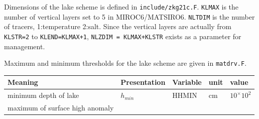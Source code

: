 Dimensions of the lake scheme is defined in \texttt{include/zkg21c.F}.
\texttt{KLMAX} is the number of vertical layers set to 5 in
MIROC6/MATSIRO6. \texttt{NLTDIM} is the number of tracers, 1:temperature
2:salt. Since the vertical layers are actually from \texttt{KLSTR=2} to
\texttt{KLEND=KLMAX+1}, \texttt{NLZDIM\ =\ KLMAX+KLSTR} exists as a
parameter for management.

Maximum and minimum thresholds for the lake scheme are given in
\texttt{matdrv.F}.

\setlength\LTleft{0pt}\setlength\LTright{0pt}\begin{longtable}[]{@{}lllll@{}}
\toprule\relax
\begin{minipage}[b]{0.30\columnwidth}\raggedright
Meaning\strut
\end{minipage} & \begin{minipage}[b]{0.15\columnwidth}\raggedright
Presentation\strut
\end{minipage} & \begin{minipage}[b]{0.09\columnwidth}\raggedright
Variable\strut
\end{minipage} & \begin{minipage}[b]{0.14\columnwidth}\raggedright
unit\strut
\end{minipage} & \begin{minipage}[b]{0.18\columnwidth}\raggedright
value\strut
\end{minipage}\tabularnewline
\midrule\relax
\endhead
\begin{minipage}[t]{0.30\columnwidth}\raggedright
minimum depth of lake\strut
\end{minipage} & \begin{minipage}[t]{0.15\columnwidth}\raggedright
\(h_{min}\)\strut
\end{minipage} & \begin{minipage}[t]{0.09\columnwidth}\raggedright
HHMIN\strut
\end{minipage} & \begin{minipage}[t]{0.14\columnwidth}\raggedright
\(\mathrm{cm}\)\strut
\end{minipage} & \begin{minipage}[t]{0.18\columnwidth}\raggedright
\(10^\times 10^{2}\)\strut
\end{minipage}\tabularnewline
\begin{minipage}[t]{0.30\columnwidth}\raggedright
maximum of surface high anomaly\strut
\end{minipage} & \begin{minipage}[t]{0.15\columnwidth}\raggedright

\end{minipage}
\end{longtable}
